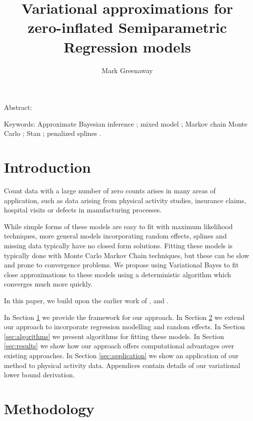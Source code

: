 \documentclass{article}[12pt]
\title{Variational approximations for zero-inflated Semiparametric Regression models}
\author{Mark Greenaway}
\begin{document}
\setlength{\parindent}{0pt}
\maketitle

Abstract:

Keywords: Approximate Bayesian inference ; mixed model ; Markov chain Monte Carlo ; Stan ; penalized splines .

\section{Introduction}
\label{sec:introduction}

Count data with a large number of zero counts arises in many areas of
application, such as data arising from physical activity studies, 
insurance claims, hospital visits or defects in manufacturing processes.

While simple forms of these models are easy to fit with maximum likelihood techniques,
more general models incorporating random effects, splines and missing data typically
have no closed form solutions. Fitting these models is typically done with Monte Carlo
Markov Chain techniques, but these can be slow and prone to convergence problems. We
propose using Variational Bayes to fit close approximations to these models
using a deterministic algorithm which converges much more quickly.


In this paper, we build upon the earlier work of \cite{lambert1992},
\cite{Ghosh20061360} and \cite{VatsaWilson2014}.

In Section \ref{sec:introduction} we provide the framework for our approach. In
Section \ref{sec:methodology} we extend our approach to incorporate regression modelling
and random effects. In Section \ref{sec:algorithms} we present algorithms for fitting these models.
In Section \ref{sec:results} we show how our approach offers computational advantages
over existing approaches. In Section \ref{sec:application} we show an application of our
method to physical activity data. Appendices contain details of our variational lower bound
derivation.

\section{Methodology}\label{sec:methodology}
\end{document}

